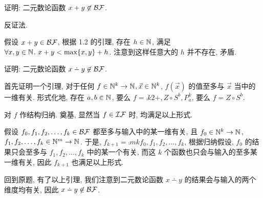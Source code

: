\begin{problem}
证明: 二元数论函数 $x + y \not\in \mathcal{BF}$.
\end{problem}

\begin{solution}
反证法.

假设 $x + y \in \mathcal{BF}$, 根据 1.2 的引理, 存在 $h \in \mathbb{N}^{}$, 满足 $\forall x, y \in \mathbb{N}^{}. ~ x + y < \max \{ x, y \} + h$. 注意到这样任意大的 $h$ 并不存在, 矛盾.
\end{solution}

\begin{problem}
证明: 二元数论函数 $x \dotminus y \not\in \BF$.
\end{problem}

\begin{solution}
首先证明一个引理, 对于任何 $f \in \mathbb{N}^{k} \to \mathbb{N}^{}, \vec{x} \in \mathbb{N}^{k}$, $f(\vec{x})$ 的值至多与 $\vec{x}$ 当中的一维有关. 形式化地, 存在 $a, b \in \mathbb{N}^{}$, 要么 $f = \comp{k}{2}{+, Z \circ S^{b}, P_{a}^{k}}$, 要么 $f = Z \circ S^{b}$.

对 $f$ 作结构归纳. 奠基, 显然当 $f \in \mathcal{IF}$ 时, 均满足以上形式.

假设 $f_0, f_1, f_2, \dots, f_k \in \mathcal{BF}$ 都至多与输入中的某一维有关, 且 $f_0 \in \mathbb{N}^{k} \to \mathbb{N}^{}$, $f_1, f_2, \dots, f_k \in \mathbb{N}^{m} \to \mathbb{N}^{}$. 于是, $f_{k+1} = \comp{m}{k}{f_0, f_1, f_2, \dots, f_k}$, 根据归纳假设, $f_0$ 的结果只会至多与 $f_1, f_2, \dots, f_k$ 中的某一个有关, 而这 $k$ 个函数也只会与输入的至多某一维有关, 因此 $f_{k+1}$ 也满足以上形式.

回到原题, 有了以上引理, 我们注意到二元数论函数 $x \dotminus y$ 的结果会与输入的两个维度均有关, 因此 $x \dotminus y \not\in \BF$.








\end{solution}

